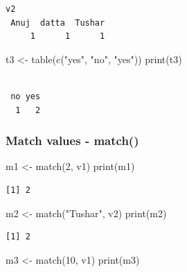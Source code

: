 \documentclass[
  letterpaper,
  DIV=11,
  numbers=noendperiod]{scrartcl}
\newenvironment{Shaded}{\begin{snugshade}}{\end{snugshade}}
\newcommand{\DecValTok}[1]{\textcolor[rgb]{0.68,0.00,0.00}{#1}}
\newcommand{\FunctionTok}[1]{\textcolor[rgb]{0.28,0.35,0.67}{#1}}
\newcommand{\NormalTok}[1]{\textcolor[rgb]{0.00,0.23,0.31}{#1}}
\newcommand{\OtherTok}[1]{\textcolor[rgb]{0.00,0.23,0.31}{#1}}
\newcommand{\StringTok}[1]{\textcolor[rgb]{0.13,0.47,0.30}{#1}}
\begin{document}
\begin{verbatim}
v2
 Anuj  datta  Tushar 
     1      1      1 
\end{verbatim}

\begin{Shaded}
\begin{Highlighting}[]
\NormalTok{t3 }\OtherTok{\textless{}{-}} \FunctionTok{table}\NormalTok{(}\FunctionTok{c}\NormalTok{(}\StringTok{"yes"}\NormalTok{, }\StringTok{"no"}\NormalTok{, }\StringTok{"yes"}\NormalTok{))}
\FunctionTok{print}\NormalTok{(t3)}
\end{Highlighting}
\end{Shaded}

\begin{verbatim}

 no yes 
  1   2 
\end{verbatim}

\subsubsection{Match values - match()}\label{match-values---match}

\begin{Shaded}
\begin{Highlighting}[]
\NormalTok{m1 }\OtherTok{\textless{}{-}} \FunctionTok{match}\NormalTok{(}\DecValTok{2}\NormalTok{, v1)}
\FunctionTok{print}\NormalTok{(m1)}
\end{Highlighting}
\end{Shaded}

\begin{verbatim}
[1] 2
\end{verbatim}

\begin{Shaded}
\begin{Highlighting}[]
\NormalTok{m2 }\OtherTok{\textless{}{-}} \FunctionTok{match}\NormalTok{(}\StringTok{"Tushar"}\NormalTok{, v2)}
\FunctionTok{print}\NormalTok{(m2)}
\end{Highlighting}
\end{Shaded}

\begin{verbatim}
[1] 2
\end{verbatim}

\begin{Shaded}
\begin{Highlighting}[]
\NormalTok{m3 }\OtherTok{\textless{}{-}} \FunctionTok{match}\NormalTok{(}\DecValTok{10}\NormalTok{, v1)}
\FunctionTok{print}\NormalTok{(m3)}
\end{Highlighting}
\end{Shaded}
\end{document}
